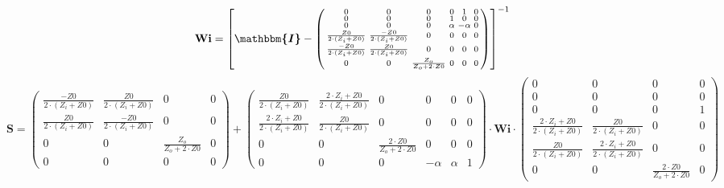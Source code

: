 \[ \mathbf{Wi} =  \left[ \boldsymbol{\mathbbm{I}}  -
\left(\begin{smallmatrix} 0 & 0 & 0 & 0 & 1 & 0 \\ 0 & 0 & 0 & 1 & 0 &
0 \\ 0 & 0 & 0 & \alpha & -\alpha & 0 \\ \frac{Z0}{2\cdot  (Z_i+Z0 )}
& \frac{-Z0}{2\cdot  (Z_i+Z0 )} & 0 & 0 & 0 & 0 \\ \frac{-Z0}{2\cdot
(Z_i+Z0 )} & \frac{Z0}{2\cdot  (Z_i+Z0 )} & 0 & 0 & 0 & 0 \\ 0 & 0 &
\frac{Z_o}{Z_o+2\cdot Z0} & 0 & 0 & 0 \end{smallmatrix}\right)
\right]^{-1}  \]
\[ \mathbf{S} = \left(\begin{smallmatrix} \frac{-Z0}{2\cdot  (Z_i+Z0
)} & \frac{Z0}{2\cdot  (Z_i+Z0 )} & 0 & 0 \\ \frac{Z0}{2\cdot  (Z_i+Z0
)} & \frac{-Z0}{2\cdot  (Z_i+Z0 )} & 0 & 0 \\ 0 & 0 &
\frac{Z_o}{Z_o+2\cdot Z0} & 0 \\ 0 & 0 & 0 & 0
\end{smallmatrix}\right) + \left(\begin{smallmatrix} \frac{Z0}{2\cdot
(Z_i+Z0 )} & \frac{2\cdot Z_i+Z0}{2\cdot  (Z_i+Z0 )} & 0 & 0 & 0 & 0
\\ \frac{2\cdot Z_i+Z0}{2\cdot  (Z_i+Z0 )} & \frac{Z0}{2\cdot  (Z_i+Z0
)} & 0 & 0 & 0 & 0 \\ 0 & 0 & \frac{2\cdot Z0}{Z_o+2\cdot Z0} & 0 & 0
& 0 \\ 0 & 0 & 0 & -\alpha & \alpha & 1 \end{smallmatrix}\right) \cdot
\mathbf{Wi} \cdot\left(\begin{smallmatrix} 0 & 0 & 0 & 0 \\ 0 & 0 & 0
& 0 \\ 0 & 0 & 0 & 1 \\ \frac{2\cdot Z_i+Z0}{2\cdot  (Z_i+Z0 )} &
\frac{Z0}{2\cdot  (Z_i+Z0 )} & 0 & 0 \\ \frac{Z0}{2\cdot  (Z_i+Z0 )} &
\frac{2\cdot Z_i+Z0}{2\cdot  (Z_i+Z0 )} & 0 & 0 \\ 0 & 0 &
\frac{2\cdot Z0}{Z_o+2\cdot Z0} & 0 \end{smallmatrix}\right) \]
